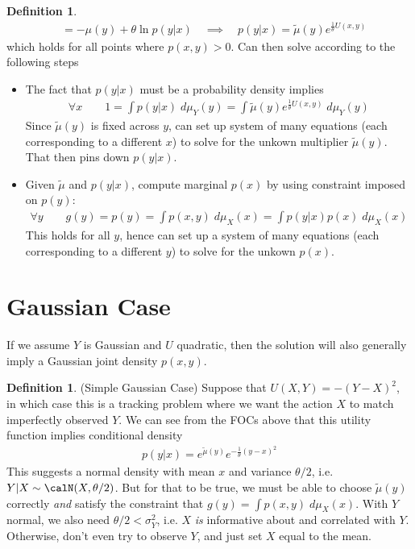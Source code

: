 \documentclass[12pt]{article}
\theoremstyle{plain}
\theoremstyle{definition}
\newtheorem{defn}[thm]{Definition}
\theoremstyle{remark}
\begin{document}
\begin{defn}
\begin{align*}
  &=
  -\mu(y)
  +
  \theta
  \ln p(y|x)
  \quad\implies\quad
  p(y|x)
  =
  \tilde{\mu}(y)
  e^{\frac{1}{\theta}U(x,y)}
\end{align*}
which holds for all points where $p(x,y)>0$.
Can then solve according to the following steps
\begin{itemize}
  \item The fact that $p(y|x)$ must be a probability density implies
    \begin{align*}
      \forall x
      \qquad
      1 = \int p(y|x) \;d\mu_Y(y) =
      \int
      \tilde{\mu}(y)e^{\frac{1}{\theta}U(x,y)}\;d\mu_Y(y)
    \end{align*}
    Since $\tilde{\mu}(y)$ is fixed across $y$, can set up system of
    many equations (each corresponding to a different $x$) to solve for
    the unkown multiplier $\tilde{\mu}(y)$.
    That then pins down $p(y|x)$.

  \item
    Given $\tilde{\mu}$ and $p(y|x)$, compute marginal $p(x)$ by
    using constraint imposed on $p(y)$:
    \begin{align*}
      \forall y\qquad
      g(y)
      = p(y)
      = \int p(x,y) \;d\mu_X(x)
      = \int p(y|x)p(x) \;d\mu_X(x)
    \end{align*}
    This holds for all $y$, hence can set up a system of many equations
    (each corresponding to a different $y$) to solve for the unkown
    $p(x)$.


\end{itemize}
\end{defn}




\clearpage
\section{Gaussian Case}

If we assume $Y$ is Gaussian and $U$ quadratic, then the solution will
also generally imply a Gaussian joint density $p(x,y)$.

\begin{defn}(Simple Gaussian Case)
Suppose that $U(X,Y)=-(Y-X)^2$, in which case this is a tracking problem
where we want the action $X$ to match imperfectly observed $Y$.
We can see from the FOCs above that this utility function implies
conditional density
\begin{align*}
  p(y|x)
  =
  e^{\tilde{\mu}(y)}
  e^{-\frac{1}{\theta}(y-x)^2}
\end{align*}
This suggests a normal density with mean $x$ and variance $\theta/2$,
i.e. $Y|X\sim\calN(X,\theta/2)$.
But for that to be true, we must be able to choose $\tilde{\mu}(y)$
correctly \emph{and} satisfy the constraint that
$g(y)=\int p(x,y)\;d\mu_X(x)$.
With $Y$ normal, we also need $\theta/2<\sigma^2_Y$, i.e. $X$ \emph{is}
informative about and correlated with $Y$.
Otherwise, don't even try to observe $Y$, and just set $X$ equal to the
mean.
\end{defn}
\end{document}
